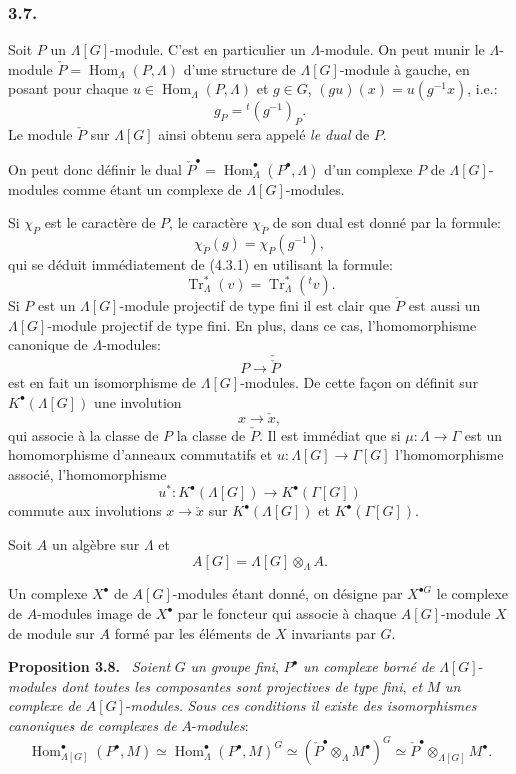 \documentclass[11pt]{article}
\newenvironment{statement}[1]{\par\medskip\noindent\textbf{#1.}\ }{\par\medskip}
\DeclareMathOperator{\Hom}{Hom}
\providecommand{\Tr}{\operatorname{Tr}}
\providecommand{\Tr}{\operatorname{Tr}}
\providecommand{\Tr}{\operatorname{Tr}}
\providecommand{\Hom}{\operatorname{Hom}}
\providecommand{\Tr}{\operatorname{Tr}}
\providecommand{\Hom}{\operatorname{Hom}}
\providecommand{\Tr}{\operatorname{Tr}}
\begin{document}
\subsubsection*{3.7.}

Soit $P$ un $\Lambda[G]$-module. C'est en particulier un $\Lambda$-module. On peut munir le $\Lambda$-module $\check P=\Hom_\Lambda(P,\Lambda)$ d'une structure de $\Lambda[G]$-module à gauche, en posant pour chaque $u\in\Hom_\Lambda(P,\Lambda)$ et $g\in G$, $(gu)(x)=u(g^{-1}x)$, i.e.:
\[
g_P={}^{t}(g^{-1})_P.
\tag{3.7.1}
\]
Le module $\check P$ sur $\Lambda[G]$ ainsi obtenu sera appelé \emph{le dual} de $P$.

On peut donc définir le dual $\check P^\bullet=\Hom_\Lambda^\bullet(P^\bullet,\Lambda)$ d'un complexe $P$ de $\Lambda[G]$-modules comme étant un complexe de $\Lambda[G]$-modules.

Si $\chi_P$ est le caractère de $P$, le caractère $\chi_{\check P}$ de son dual est donné par la formule:
\[
\chi_{\check P}(g)=\chi_P(g^{-1}),
\tag{3.7.2}
\]
qui se déduit immédiatement de (4.3.1) en utilisant la formule:
\[
\Tr_\Lambda^*(v)=\Tr_\Lambda^*({}^{t}v).
\]
Si $P$ est un $\Lambda[G]$-module projectif de type fini il est clair que $\check P$ est aussi un $\Lambda[G]$-module projectif de type fini. En plus, dans ce cas, l'homomorphisme canonique de $\Lambda$-modules:
\[
P\longrightarrow\check{\check P}
\]
est en fait un isomorphisme de $\Lambda[G]$-modules. De cette façon on définit sur $K^{\bullet}(\Lambda[G])$ une involution
\[
x\longrightarrow \check x,
\]
qui associe à la classe de $P$ la classe de $\check P$. Il est immédiat que si $\mu:\Lambda\to\Gamma$ est un homomorphisme d'anneaux commutatifs et $u:\Lambda[G]\to\Gamma[G]$ l'homomorphisme associé, l'homomorphisme
\[
u^*:K^{\bullet}(\Lambda[G])\longrightarrow K^{\bullet}(\Gamma[G])
\]
commute aux involutions $x\longrightarrow \check x$ sur 
$K^{\bullet}(\Lambda[G])$ et $K^{\bullet}(\Gamma[G])$.

Soit $A$ un algèbre sur $\Lambda$ et
\[
A[G]=\Lambda[G]\otimes_\Lambda A.
\]

Un complexe $X^\bullet$ de $A[G]$-modules étant donné, on désigne par $X^{\bullet G}$ le complexe de $A$-modules image de $X^\bullet$ par le foncteur qui associe à chaque $A[G]$-module $X$ de module sur $A$ formé par les éléments de $X$ invariants par $G$.

\begin{statement}{Proposition 3.8}
\emph{Soient} $G$ \emph{un groupe fini}, $P^\bullet$ \emph{un complexe borné de} $\Lambda[G]$-\emph{modules dont toutes les composantes sont projectives de type fini}, \emph{et} $M$ \emph{un complexe de} $A[G]$-\emph{modules}. \emph{Sous ces conditions il existe des isomorphismes canoniques de complexes de} $A$-\emph{modules}:
\[
\Hom_{\Lambda[G]}^\bullet(P^\bullet,M)
\simeq \Hom_\Lambda^\bullet(P^\bullet,M)^G
\simeq (\check P^\bullet\otimes_\Lambda M^\bullet)^G
\simeq \check P^\bullet\otimes_{\Lambda[G]}M^\bullet.
\tag{3.8.1}
\]
\end{statement}
\end{document}
